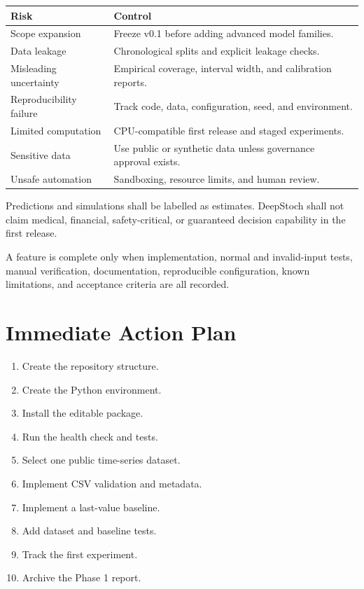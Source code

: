 \documentclass[11pt,a4paper]{report}
\begin{document}
\begin{tabularx}{\textwidth}{p{3.5cm}Y}
\toprule Risk & Control \\
\midrule
Scope expansion & Freeze v0.1 before adding advanced model families. \\
Data leakage & Chronological splits and explicit leakage checks. \\
Misleading uncertainty & Empirical coverage, interval width, and calibration reports. \\
Reproducibility failure & Track code, data, configuration, seed, and environment. \\
Limited computation & CPU-compatible first release and staged experiments. \\
Sensitive data & Use public or synthetic data unless governance approval exists. \\
Unsafe automation & Sandboxing, resource limits, and human review. \\
\bottomrule
\end{tabularx}

Predictions and simulations shall be labelled as estimates. DeepStoch shall not claim medical, financial, safety-critical, or guaranteed decision capability in the first release.

A feature is complete only when implementation, normal and invalid-input tests, manual verification, documentation, reproducible configuration, known limitations, and acceptance criteria are all recorded.

\chapter{Immediate Action Plan}

\begin{enumerate}
\item Create the repository structure.
\item Create the Python environment.
\item Install the editable package.
\item Run the health check and tests.
\item Select one public time-series dataset.
\item Implement CSV validation and metadata.
\item Implement a last-value baseline.
\item Add dataset and baseline tests.
\item Track the first experiment.
\item Archive the Phase 1 report.
\end{enumerate}
\end{document}
